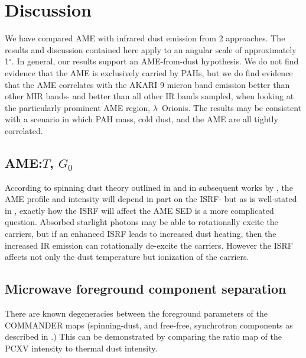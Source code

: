\chapter{Discussion}
  \label{ch:discussion}

    We have compared AME with infrared dust emission from 2 approaches. The results and discussion contained here apply to an angular scale of approximately 1$^{\circ}$. In general, our results support an AME-from-dust hypothesis. We do not find evidence that the AME is exclusively carried by PAHs, but we do find evidence that the AME correlates with the AKARI 9 micron band emission better than other MIR bands- and better than all other IR bands sampled, when looking at the particularly prominent AME region, $\lambda$~Orionis. The results may be consistent with a scenario in which PAH mass, cold dust, and the AME are all tightly correlated.

\section{AME:$T$, $G_{0}$}

    According to spinning dust theory outlined in \cite{draine98a} and in subsequent works by \cite{ysard10a}, the AME profile and intensity will depend in part on the ISRF- but as is well-stated in \cite{hensley17a}, exactly how the ISRF will affect the AME SED is a more complicated question. Absorbed starlight photons may be able to rotationally excite the carriers, but if an enhanced ISRF leads to increased dust heating, then the increased IR emission can rotationally de-excite the carriers. However the ISRF affects not only the dust temperature but ionization of the carriers.


\section{Microwave foreground component separation}

    There are known degeneracies between the foreground parameters of the COMMANDER maps (spinning-dust, and free-free, synchrotron components as described in \cite{planck15X}.) This can be demonstrated by comparing the ratio map of the PCXV intensity to thermal dust intensity.
